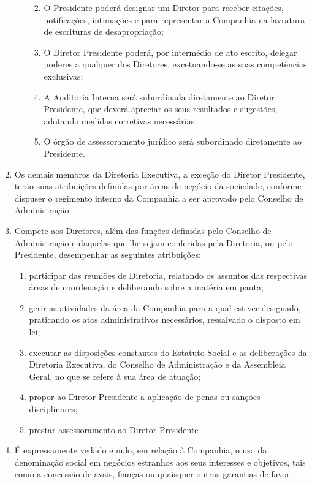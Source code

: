 \documentclass[a4paper,11pt]{report}
\begin{document}
\begin{enumerate}[resume, label=Art. \arabic*]
\begin{enumerate}[label=\roman*.]
\begin{enumerate}[label= \S \arabic*]
\begin{enumerate}[label=\roman*.]
                        \end{enumerate}
                \item O Presidente poderá designar um Diretor para receber citações, notificações, intimações e para representar a Companhia na lavratura de escrituras de desapropriação;
                \item O Diretor Presidente poderá, por intermédio de ato escrito, delegar poderes a qualquer dos Diretores, excetuando-se as suas competências exclusivas;
                \item A Auditoria Interna será subordinada diretamente ao Diretor Presidente, que deverá apreciar os seus resultados e sugestões, adotando medidas corretivas necessárias;
                \item O órgão de assessoramento jurídico será subordinado diretamente ao Presidente.
                \end{enumerate}
        \end{enumerate}
\item Os demais membros da Diretoria Executiva, a exceção do Diretor Presidente, terão suas atribuições definidas por áreas de negócio da sociedade, conforme dispuser o regimento interno da Companhia a ser aprovado pelo Conselho de Administração
\item Compete aos Diretores, além das funções definidas pelo Conselho de Administração e daquelas que lhe sejam conferidas pela Diretoria, ou pelo Presidente, desempenhar as seguintes atribuições:
        \begin{enumerate}[label=\roman*.]
        \item participar das reuniões de Diretoria, relatando os assuntos das respectivas áreas de coordenação e deliberando sobre a matéria em pauta;
        \item gerir as atividades da área da Companhia para a qual estiver designado, praticando os atos administrativos necessários, ressalvado o disposto em lei;
        \item executar as disposições constantes do Estatuto Social e as deliberações da Diretoria Executiva, do Conselho de Administração e da Assembleia Geral, no que se refere à sua área de atuação;
        \item propor ao Diretor Presidente a aplicação de penas ou sanções disciplinares;
        \item prestar assessoramento ao Diretor Presidente
        \end{enumerate}
\item É expressamente vedado e nulo, em relação à Companhia, o uso da denominação social em negócios estranhos aos seus interesses e objetivos, tais como a concessão de avais, fianças ou quaisquer outras garantias de favor.


\end{enumerate}
\end{document}
